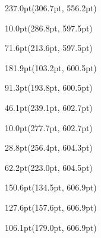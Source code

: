 \documentclass{article}
\begin{document}
\begin{textblock*}{237.0pt}(306.7pt, 556.2pt)%
\noindent%
%
\end{textblock*}
\begin{textblock*}{10.0pt}(286.8pt, 597.5pt)%
\noindent%
%
\end{textblock*}
\begin{textblock*}{71.6pt}(213.6pt, 597.5pt)%
\noindent%
%
\end{textblock*}
\begin{textblock*}{181.9pt}(103.2pt, 600.5pt)%
\noindent%
%
\end{textblock*}
\begin{textblock*}{91.3pt}(193.8pt, 600.5pt)%
\noindent%
%
\end{textblock*}
\begin{textblock*}{46.1pt}(239.1pt, 602.7pt)%
\noindent%
%
\end{textblock*}
\begin{textblock*}{10.0pt}(277.7pt, 602.7pt)%
\noindent%
%
\end{textblock*}
\begin{textblock*}{28.8pt}(256.4pt, 604.3pt)%
\noindent%
%
\end{textblock*}
\begin{textblock*}{62.2pt}(223.0pt, 604.5pt)%
\noindent%
%
\end{textblock*}
\begin{textblock*}{150.6pt}(134.5pt, 606.9pt)%
\noindent%
%
\end{textblock*}
\begin{textblock*}{127.6pt}(157.6pt, 606.9pt)%
\noindent%
%
\end{textblock*}
\begin{textblock*}{106.1pt}(179.0pt, 606.9pt)%
\noindent%
%
\end{textblock*}
\end{document}
